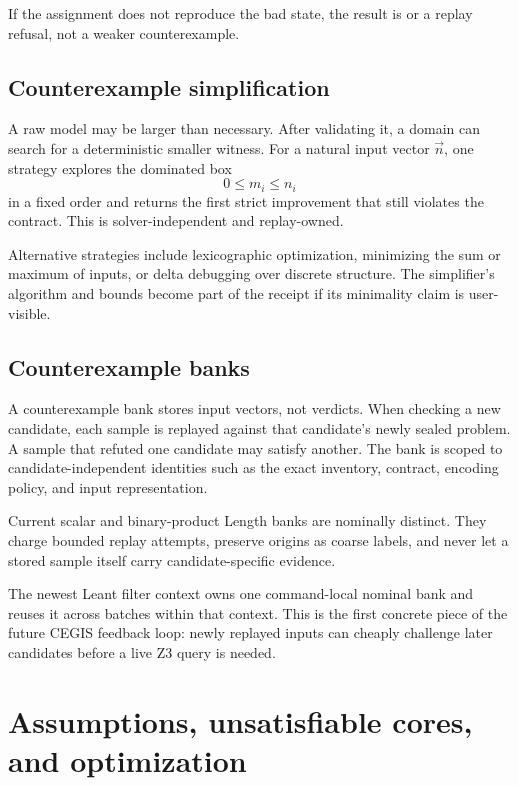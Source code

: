 \documentclass[10pt,letterpaper,oneside]{report}
\newcommand{\code}[1]{\texttt{\detokenize{#1}}}
\begin{document}
If the assignment does not reproduce the bad state, the result is \code{Nothing} or a replay refusal, not a weaker counterexample.

\section{Counterexample simplification}

A raw model may be larger than necessary. After validating it, a domain can search for a deterministic smaller witness. For a natural input vector $\vec{n}$, one strategy explores the dominated box
\[
  0\le m_i\le n_i
\]
in a fixed order and returns the first strict improvement that still violates the contract. This is solver-independent and replay-owned.

Alternative strategies include lexicographic optimization, minimizing the sum or maximum of inputs, or delta debugging over discrete structure. The simplifier's algorithm and bounds become part of the receipt if its minimality claim is user-visible.

\section{Counterexample banks}

A counterexample bank stores input vectors, not verdicts. When checking a new candidate, each sample is replayed against that candidate's newly sealed problem. A sample that refuted one candidate may satisfy another. The bank is scoped to candidate-independent identities such as the exact inventory, contract, encoding policy, and input representation.

Current scalar and binary-product Length banks are nominally distinct. They charge bounded replay attempts, preserve origins as coarse labels, and never let a stored sample itself carry candidate-specific evidence.

\begin{projectnote}
The newest Leant filter context owns one command-local nominal bank and reuses it across batches within that context. This is the first concrete piece of the future CEGIS feedback loop: newly replayed inputs can cheaply challenge later candidates before a live Z3 query is needed.
\end{projectnote}

\chapter{Assumptions, unsatisfiable cores, and optimization}
\label{chap:cores-opt}
\end{document}
